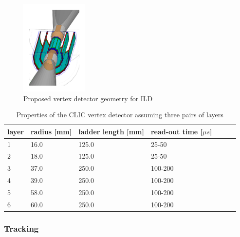\begin{figure}
  \centering
  \includegraphics[width=0.3\textwidth,keepaspectratio]{Experiments/fig/Vertex}
  \caption[ILD Vertex Detector]{Proposed vertex detector geometry for ILD \cite{ILD}}
  \label{fig:VTX}
\end{figure}

\begin{table}
  \caption{Properties of the CLIC vertex detector assuming three pairs of layers \cite{ILD}}
  \centering

  \begin{tabular}{l l l l l l l}
    \toprule
    layer           & radius [mm]         & ladder length [mm]  & read-out time [$\mu s$]  \\
    \midrule
    1 & 16.0 & 125.0 & 25-50 \\
    2 & 18.0 & 125.0 & 25-50 \\
    3 & 37.0 & 250.0 & 100-200 \\
    4 & 39.0 & 250.0 & 100-200 \\
    5 & 58.0 & 250.0 & 100-200 \\
    6 & 60.0 & 250.0 & 100-200 \\
    \bottomrule
  \end{tabular}
  \label{tab:aVTX}

\end{table}


\subsubsection{Tracking}

